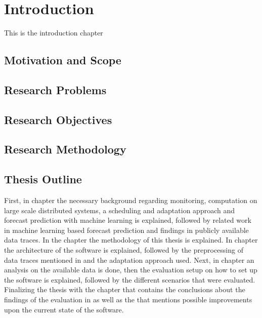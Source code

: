 \chapter{Introduction}

    This is the introduction chapter

    \section{Motivation and Scope}

    \section{Research Problems}
    \section{Research Objectives}
    \section{Research Methodology}
    \section{Thesis Outline}

        First, in chapter  the necessary background regarding monitoring, computation on large scale distributed systems, a scheduling and adaptation approach and forecast prediction with machine learning is explained, followed by related work in machine learning based forecast prediction and findings in publicly available data traces.
        In the chapter  the methodology of this thesis is explained. 
        In chapter  the architecture of the software is explained, followed by the preprocessing of data traces mentioned in  and the adaptation approach used.
        Next, in chapter  an analysis on the available data is done, then the evaluation setup on how to set up the software is explained, followed by the different scenarios that were evaluated. 
        Finalizing the thesis with the chapter  that contains the conclusions about the findings of the evaluation in  as well as the  that mentions possible improvements upon the current state of the software.


